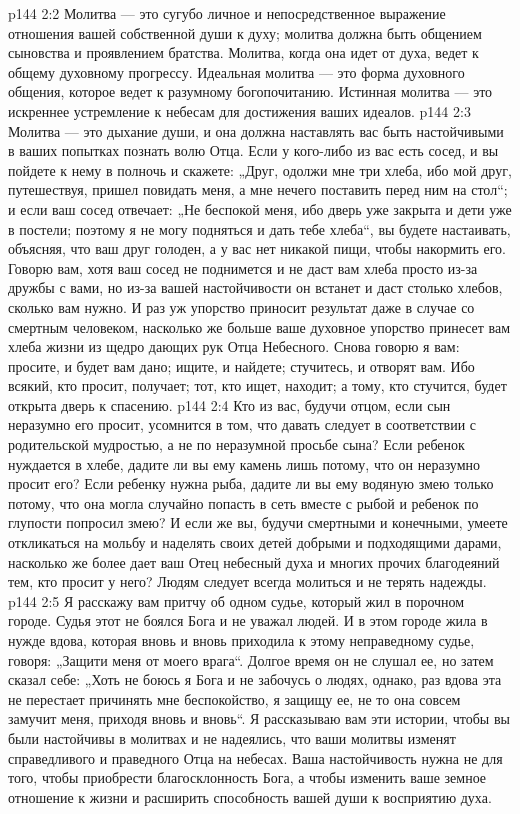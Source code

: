 \vs p144 2:2 Молитва --- это сугубо личное и непосредственное выражение отношения вашей собственной души к духу; молитва должна быть общением сыновства и проявлением братства. Молитва, когда она идет от духа, ведет к общему духовному прогрессу. Идеальная молитва --- это форма духовного общения, которое ведет к разумному богопочитанию. Истинная молитва --- это искреннее устремление к небесам для достижения ваших идеалов.
\vs p144 2:3 Молитва --- это дыхание души, и она должна наставлять вас быть настойчивыми в ваших попытках познать волю Отца. Если у кого\hyp{}либо из вас есть сосед, и вы пойдете к нему в полночь и скажете: „Друг, одолжи мне три хлеба, ибо мой друг, путешествуя, пришел повидать меня, а мне нечего поставить перед ним на стол“; и если ваш сосед отвечает: „Не беспокой меня, ибо дверь уже закрыта и дети уже в постели; поэтому я не могу подняться и дать тебе хлеба“, вы будете настаивать, объясняя, что ваш друг голоден, а у вас нет никакой пищи, чтобы накормить его. Говорю вам, хотя ваш сосед не поднимется и не даст вам хлеба просто из\hyp{}за дружбы с вами, но из\hyp{}за вашей настойчивости он встанет и даст столько хлебов, сколько вам нужно. И раз уж упорство приносит результат даже в случае со смертным человеком, насколько же больше ваше духовное упорство принесет вам хлеба жизни из щедро дающих рук Отца Небесного. Снова говорю я вам: просите, и будет вам дано; ищите, и найдете; стучитесь, и отворят вам. Ибо всякий, кто просит, получает; тот, кто ищет, находит; а тому, кто стучится, будет открыта дверь к спасению.
\vs p144 2:4 Кто из вас, будучи отцом, если сын неразумно его просит, усомнится в том, что давать следует в соответствии с родительской мудростью, а не по неразумной просьбе сына? Если ребенок нуждается в хлебе, дадите ли вы ему камень лишь потому, что он неразумно просит его? Если ребенку нужна рыба, дадите ли вы ему водяную змею только потому, что она могла случайно попасть в сеть вместе с рыбой и ребенок по глупости попросил змею? И если же вы, будучи смертными и конечными, умеете откликаться на мольбу и наделять своих детей добрыми и подходящими дарами, насколько же более дает ваш Отец небесный духа и многих прочих благодеяний тем, кто просит у него? Людям следует всегда молиться и не терять надежды.
\vs p144 2:5 Я расскажу вам притчу об одном судье, который жил в порочном городе. Судья этот не боялся Бога и не уважал людей. И в этом городе жила в нужде вдова, которая вновь и вновь приходила к этому неправедному судье, говоря: „Защити меня от моего врага“. Долгое время он не слушал ее, но затем сказал себе: „Хоть не боюсь я Бога и не забочусь о людях, однако, раз вдова эта не перестает причинять мне беспокойство, я защищу ее, не то она совсем замучит меня, приходя вновь и вновь“. Я рассказываю вам эти истории, чтобы вы были настойчивы в молитвах и не надеялись, что ваши молитвы изменят справедливого и праведного Отца на небесах. Ваша настойчивость нужна не для того, чтобы приобрести благосклонность Бога, а чтобы изменить ваше земное отношение к жизни и расширить способность вашей души к восприятию духа.
